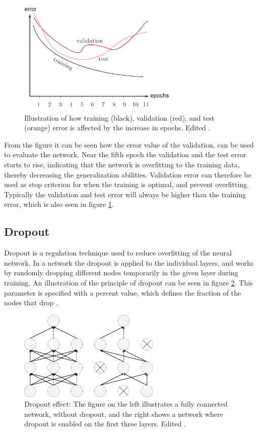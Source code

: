 \begin{figure} [H]
\centering
\includegraphics[width=0.7\textwidth]{figures/learningCurves}
\caption{Illustration of how training (black), validation (red), and test (orange) error is affected by the increase in epochs. Edited \citep{Duda2000}.}
\label{fig:learningCurve}
\end{figure}

\noindent
From the figure it can be seen how the error value of the validation, can be used to evaluate the network. 
Near the fifth epoch the validation and the test error starts to rise, indicating that the network is overfitting to the training data, thereby decreasing the generalization abilities. 
Validation error can therefore be used as stop criterion for when the training is optimal, and prevent overfitting. 
Typically the validation and test error will always be higher than the training error, which is also seen in figure \ref{fig:learningCurve}.\citep{Duda2000}

\subsection{Dropout}\label{sec:dropout}
Dropout is a regulation technique used to reduce overfitting of the neural network. In a network the dropout is applied to the individual layers, and works by randomly dropping different nodes temporarily in the given layer during training. An illustration of the principle of dropout can be seen in figure \ref{fig:Dropout}. This parameter is specified with a percent value, which defines the fraction of the nodes that drop \citep{Chollet2015}.

\begin{figure} [H]
\centering
\includegraphics[width=0.6\textwidth]{figures/Dropout}
\caption{Dropout effect: The figure on the left illustrates a fully connected network, without dropout, and the right shows a network where dropout is enabled on the first three layers. Edited \citep{Srivastava2014}.}
\label{fig:Dropout} 
\end{figure}

